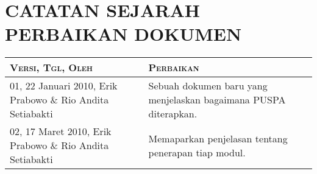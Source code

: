 \part*{\textcolor{sectioncolor}{\textsf{\large CATATAN SEJARAH PERBAIKAN DOKUMEN}}}

\begin{tabular}{|p{4cm}|p{11cm}|}
\hline
{\scshape Versi, Tgl, Oleh} & {\scshape Perbaikan}\\
\hline
01, 22 Januari 2010, Erik Prabowo \& Rio Andita Setiabakti & Sebuah dokumen baru yang menjelaskan bagaimana PUSPA diterapkan.\\
\hline
02, 17 Maret 2010, Erik Prabowo \& Rio Andita Setiabakti & Memaparkan penjelasan tentang penerapan tiap modul.\\
\hline
\end{tabular}
